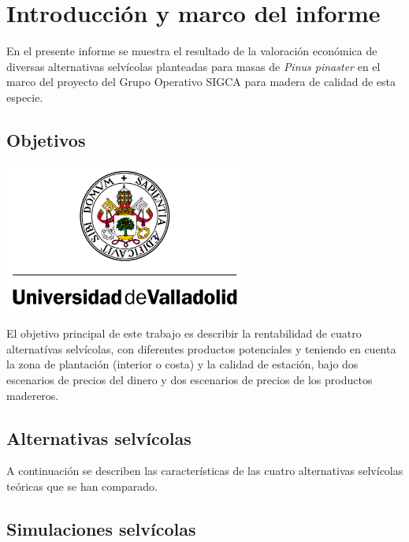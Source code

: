 \documentclass[
]{article}
\author{}
\date{\vspace{-2.5em}}
\begin{document}
\tableofcontents

\hypertarget{introducciuxf3n-y-marco-del-informe}{%
\section{Introducción y marco del
informe}\label{introducciuxf3n-y-marco-del-informe}}

En el presente informe se muestra el resultado de la valoración
económica de diversas alternativas selvícolas planteadas para masas de
\emph{Pinus pinaster} en el marco del proyecto del Grupo Operativo SIGCA
para madera de calidad de esta especie.

\hypertarget{objetivos}{%
\subsection{Objetivos}\label{objetivos}}

\begin{center}\includegraphics[width=300px]{./imagenes/UVa_logo_color_conLetras} \end{center}

El objetivo principal de este trabajo es describir la rentabilidad de
cuatro alternatívas selvícolas, con diferentes productos potenciales y
teniendo en cuenta la zona de plantación (interior o costa) y la calidad
de estación, bajo dos escenarios de precios del dinero y dos escenarios
de precios de los productos madereros.

\hypertarget{alternativas-selvuxedcolas}{%
\subsection{Alternativas selvícolas}\label{alternativas-selvuxedcolas}}

A continuación se describen las características de las cuatro
alternativas selvícolas teóricas que se han comparado.

\hypertarget{simulaciones-selvuxedcolas}{%
\subsection{Simulaciones selvícolas}\label{simulaciones-selvuxedcolas}}
\end{document}
